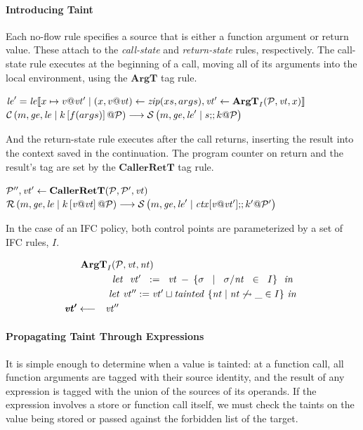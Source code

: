\documentclass{article}
\begin{document}
\paragraph{Introducing Taint}

Each no-flow rule specifies a source that is either a function argument or return
value. These attach to the {\em call-state} and {\em return-state} rules, respectively.
The call-state rule executes at the beginning of a call, moving all of its arguments into
the local environment, using the \(\mathbf{ArgT}\) tag rule.

           {\(\lenv' = \lenv \llbracket x \mapsto v@\vt' \mid
             (x,v@\vt) \leftarrow \mathit{zip}(xs,args), \vt' \leftarrow \argt{I}{\PCT}{\vt}{x} \rrbracket\)}
           {\(\cstate{\PCT}{\mem}{\genv}{\lenv}{f}{args}{\cont} \longrightarrow
             \sstate{\PCT}{\mem}{\genv}{\lenv'}{\stmt}{\cont}\)}

And the return-state rule executes after the call returns, inserting the result into the
context saved in the continuation. The program counter on return and the result's tag are
set by the \(\mathbf{CallerRetT}\) tag rule.
           
            {\(\PCT'',\vt' \leftarrow \callerrett{\PCT}{\PCT'}{\vt}\)}
            {\(\rstate{\PCT}{\mem}{\genv}{\lenv}{\val{v}{\vt}}{\cont} \longrightarrow
              \sstate{\PCT'}{\mem}{\genv}{\lenv'}{\mathit{ctx}[\val{v}{\vt'}]}{\cont'}\)}

In the case of an IFC policy, both control points are parameterized by a set of IFC rules, \(I\).

\begin{minipage}[t]{.49\textwidth}            
  \[\begin{aligned}
  \truledef{\argt{I}{\PCT}{\vt}{\nt}}
  \letin{\vt' := \vt - \{\sigma \mid \sigma / \nt \in I \}}
  \letin{\vt'' := \vt' \sqcup \mathit{tainted} ~ \{\nt \mid \nt \not \rightsquigarrow \_ \in I\}}
  \settag{\vt'}{\vt''}
  \end{aligned}\]
\end{minipage}

\paragraph{Propagating Taint Through Expressions}

It is simple enough to determine when a value is tainted: at a function
call, all function arguments are tagged with their source identity, and the result
of any expression is tagged with the union of the sources of its operands. If the
expression involves a store or function call itself, we must check the taints on
the value being stored or passed against the forbidden list of the target.
\end{document}
